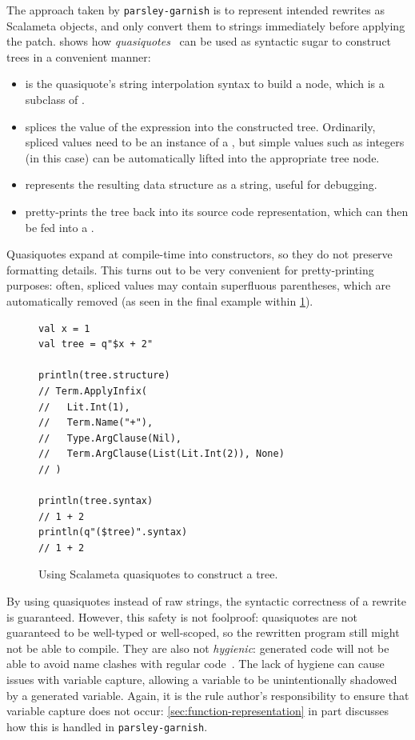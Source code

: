 \documentclass[../../main.tex]{subfiles}
\begin{document}
The approach taken by \texttt{parsley-garnish} is to represent intended rewrites as Scalameta  objects, and only convert them to strings immediately before applying the patch.
 shows how \emph{quasiquotes}~\cite{shabalin_quasiquotes_2013} can be used as syntactic sugar to construct trees in a convenient manner:
\begin{itemize}
  \item {} is the quasiquote's string interpolation syntax to build a  node, which is a subclass of .
  \item {} splices the value of the expression  into the constructed tree. Ordinarily, spliced values need to be an instance of a , but simple values such as integers (in this case) can be automatically lifted into the appropriate tree node.
  \item {} represents the resulting  data structure as a string, useful for debugging.
  \item {} pretty-prints the tree back into its source code representation, which can then be fed into a .
\end{itemize}
Quasiquotes expand at compile-time into  constructors, so they do not preserve formatting details.
This turns out to be very convenient for pretty-printing purposes: often, spliced values may contain superfluous parentheses, which are automatically removed (as seen in the final example within \cref{fig:quasiquote-ex}).

\begin{figure}[htbp]
\begin{verbatim}
val x = 1
val tree = q"$x + 2"

println(tree.structure)
// Term.ApplyInfix(
//   Lit.Int(1),
//   Term.Name("+"),
//   Type.ArgClause(Nil),
//   Term.ArgClause(List(Lit.Int(2)), None)
// )

println(tree.syntax)
// 1 + 2
println(q"($tree)".syntax)
// 1 + 2
\end{verbatim}
\caption{Using Scalameta quasiquotes to construct a tree.}
\label{fig:quasiquote-ex}
\end{figure}

By using quasiquotes instead of raw strings, the syntactic correctness of a rewrite is guaranteed.
However, this safety is not foolproof: quasiquotes are not guaranteed to be well-typed or well-scoped, so the rewritten program still might not be able to compile.
They are also not \emph{hygienic}: generated code will not be able to avoid name clashes with regular code~\cite{burmako_scalameta_2017}.
The lack of hygiene can cause issues with variable capture, allowing a variable to be unintentionally shadowed by a generated variable.
Again, it is the rule author's responsibility to ensure that variable capture does not occur: \cref{sec:function-representation} in part discusses how this is handled in \texttt{parsley-garnish}.
\end{document}
